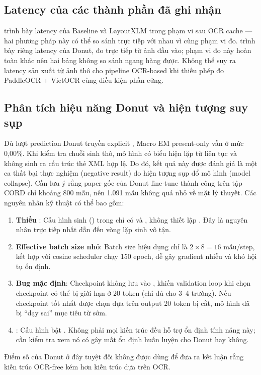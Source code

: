 \subsection{Latency của các thành phần đã ghi nhận}
\label{subsec:latency_evaluation}



 trình bày latency của Baseline và LayoutXLM trong phạm vi sau OCR cache — hai phương pháp này có thể so sánh trực tiếp với nhau vì cùng phạm vi đo.  trình bày riêng latency của Donut, đo trực tiếp từ ảnh đầu vào; phạm vi đo này hoàn toàn khác nên hai bảng không so sánh ngang hàng được. Không thể suy ra latency sản xuất từ ảnh thô cho pipeline OCR-based khi thiếu phép đo PaddleOCR + VietOCR cùng điều kiện phần cứng.

\subsection{Phân tích hiệu năng Donut và hiện tượng suy sụp}
\label{subsec:donut_performance}



Dù lượt prediction Donut truyền explicit , Macro EM present-only vẫn ở mức 0,00\%. Khi kiểm tra chuỗi sinh thô, mô hình có biểu hiện lặp từ liên tục và không sinh ra cấu trúc thẻ XML hợp lệ. Do đó, kết quả này được đánh giá là một ca thất bại thực nghiệm (negative result) do hiện tượng sụp đổ mô hình (model collapse). Cần lưu ý rằng paper gốc của Donut fine-tune thành công trên tập CORD chỉ khoảng 800 mẫu, nên 1.091 mẫu không quá nhỏ về mặt lý thuyết. Các nguyên nhân kỹ thuật có thể bao gồm:
\begin{enumerate}
  \item \textbf{Thiếu }: Cấu hình sinh () trong  chỉ có  và , không thiết lập . Đây là nguyên nhân trực tiếp nhất dẫn đến vòng lặp sinh vô tận.
  \item \textbf{Effective batch size nhỏ}: Batch size hiệu dụng chỉ là $2 \times 8 = 16$ mẫu/step, kết hợp với cosine scheduler chạy 150 epoch, dễ gây gradient nhiễu và khó hội tụ ổn định.
  \item \textbf{Bug  mặc định}: Checkpoint không lưu  vào , khiến validation loop khi chọn checkpoint có thể bị giới hạn ở 20 token (chỉ đủ cho 3--4 trường). Nếu checkpoint tốt nhất được chọn dựa trên output 20 token bị cắt, mô hình đã bị ``dạy sai'' mục tiêu từ sớm.
  \item \textbf{}: Cấu hình bật . Không phải mọi kiến trúc đều hỗ trợ ổn định tính năng này; cần kiểm tra xem nó có gây mất ổn định huấn luyện cho Donut hay không.
\end{enumerate}
Điểm số của Donut ở đây tuyệt đối không được dùng để đưa ra kết luận rằng kiến trúc OCR-free kém hơn kiến trúc dựa trên OCR.

